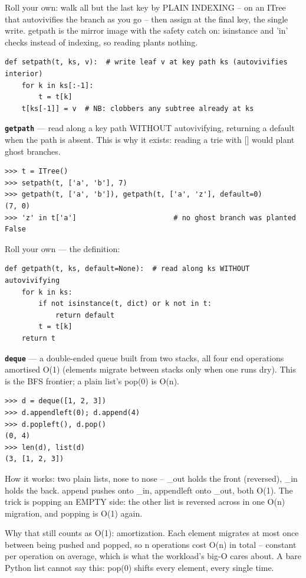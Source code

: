 \documentclass[10pt,letterpaper]{article}
\begin{document}
Roll your own: walk all but the last key by PLAIN INDEXING -- on an ITree that autovivifies the branch as you go -- then assign at the final key, the single write. getpath is the mirror image with the safety catch on: isinstance and 'in' checks instead of indexing, so reading plants nothing.

\begin{lstlisting}[style=ex]
def setpath(t, ks, v):  # write leaf v at key path ks (autovivifies interior)
    for k in ks[:-1]:
        t = t[k]
    t[ks[-1]] = v  # NB: clobbers any subtree already at ks
\end{lstlisting}
\textbf{\texttt{getpath}} --- read along a key path WITHOUT autovivifying, returning a default when the path is absent. This is why it exists: reading a trie with [] would plant ghost branches.
\begin{lstlisting}[style=ex]
>>> t = ITree()
>>> setpath(t, ['a', 'b'], 7)
>>> getpath(t, ['a', 'b']), getpath(t, ['a', 'z'], default=0)
(7, 0)
>>> 'z' in t['a']                       # no ghost branch was planted
False
\end{lstlisting}

Roll your own --- the definition:

\begin{lstlisting}[style=ex]
def getpath(t, ks, default=None):  # read along ks WITHOUT autovivifying
    for k in ks:
        if not isinstance(t, dict) or k not in t:
            return default
        t = t[k]
    return t
\end{lstlisting}
\textbf{\texttt{deque}} --- a double-ended queue built from two stacks, all four end operations amortised O(1) (elements migrate between stacks only when one runs dry). This is the BFS frontier; a plain list's pop(0) is O(n).
\begin{lstlisting}[style=ex]
>>> d = deque([1, 2, 3])
>>> d.appendleft(0); d.append(4)
>>> d.popleft(), d.pop()
(0, 4)
>>> len(d), list(d)
(3, [1, 2, 3])
\end{lstlisting}

How it works: two plain lists, nose to nose -- \_out holds the front (reversed), \_in holds the back. append pushes onto \_in, appendleft onto \_out, both O(1). The trick is popping an EMPTY side: the other list is reversed across in one O(n) migration, and popping is O(1) again.


Why that still counts as O(1): amortization. Each element migrates at most once between being pushed and popped, so n operations cost O(n) in total -- constant per operation on average, which is what the workload's big-O cares about. A bare Python list cannot say this: pop(0) shifts every element, every single time.
\end{document}
